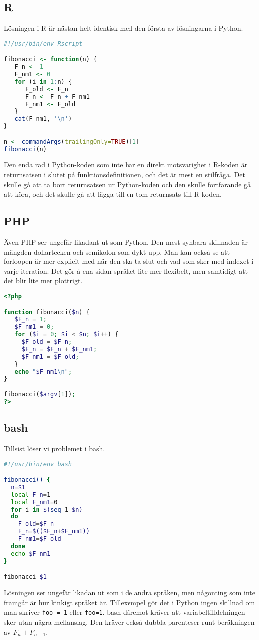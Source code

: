 \documentclass[10pt, twoside,a4paper]{article}
\begin{document}
\subsection{R}
Lösningen i R är nästan helt identisk med den första av lösningarna i Python. 
\begin{lstlisting}[language=R]
#!/usr/bin/env Rscript

fibonacci <- function(n) {
   F_n <- 1
   F_nm1 <- 0
   for (i in 1:n) {
      F_old <- F_n
      F_n <- F_n + F_nm1
      F_nm1 <- F_old
   }
   cat(F_nm1, '\n')
}

n <- commandArgs(trailingOnly=TRUE)[1]
fibonacci(n)
\end{lstlisting}
Den enda rad i Python-koden som inte har en direkt motsvarighet i R-koden är returnsatsen i slutet på funktionsdefinitionen, och det är mest en stilfråga. Det skulle gå att ta bort returnsatsen ur Python-koden och den skulle fortfarande gå att köra, och det skulle gå att lägga till en tom returnsats till R-koden.

\subsection{PHP}
Även PHP ser ungefär likadant ut som Python. Den mest synbara skillnaden är mängden dollartecken och semikolon som dykt upp. Man kan också se att forloopen är mer explicit med när den ska ta slut och vad som sker med indexet i varje iteration. Det gör å ena sidan språket lite mer flexibelt, men samtidigt att det blir lite mer plottrigt.
\begin{lstlisting}[language=PHP]
<?php

function fibonacci($n) {
   $F_n = 1;
   $F_nm1 = 0;
   for ($i = 0; $i < $n; $i++) {
     $F_old = $F_n;
     $F_n = $F_n + $F_nm1;
     $F_nm1 = $F_old;
   }
   echo "$F_nm1\n";
}

fibonacci($argv[1]);
?>
\end{lstlisting}

\newpage
\subsection{bash}
Tillsist löser vi problemet i bash.
\begin{lstlisting}[language=bash]
#!/usr/bin/env bash

fibonacci() {
  n=$1
  local F_n=1
  local F_nm1=0
  for i in $(seq 1 $n)
  do
    F_old=$F_n
    F_n=$(($F_n+$F_nm1))
    F_nm1=$F_old
  done
  echo $F_nm1
}

fibonacci $1
\end{lstlisting}
Lösningen ser ungefär likadan ut som i de andra språken, men någonting som inte framgår är hur kinkigt språket är. Tillexempel gör det i Python ingen skillnad om man skriver \verb+foo = 1+ eller \verb+foo=1+. bash däremot kräver att variabeltilldelningen sker utan några mellanslag. Den kräver också dubbla parenteser runt beräkningen av $F_n + F_{n-1}$.
\end{document}
